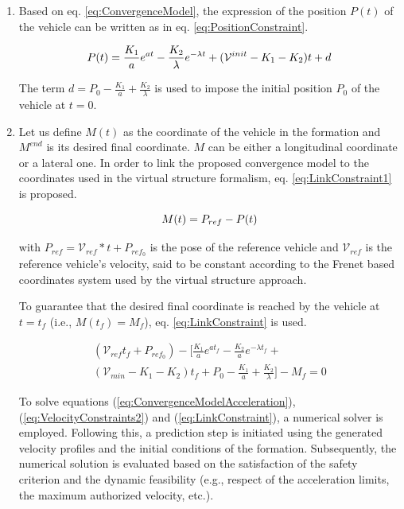 \begin{enumerate}
\item Based on eq. \ref{eq:ConvergenceModel}, the expression of the position $P(t)$ of the vehicle can be written as in eq. \ref{eq:PositionConstraint}. 

\begin{equation} \label{eq:PositionConstraint}
    P(t)= \frac{K_1}{a} e^{a t } - \frac{K_2}{\lambda} e^{-\lambda t }   + (\mathcal{V}^{init}- K_1 -K_2 )t +d \\
\end{equation}

The term $d=P_0 - \frac{K_1}{a} + \frac{K_2}{\lambda}$ is used to impose the initial position $P_0$ of the vehicle at $t=0$. 

\item Let us define $M(t)$ as the coordinate of the vehicle in the formation and $M^{end}$ is its desired final coordinate. $M$ can be either a longitudinal coordinate or a lateral one. In order to link the proposed convergence model to the coordinates used in the virtual structure formalism, eq. \ref{eq:LinkConstraint1} is proposed. 


\begin{equation} \label{eq:LinkConstraint1}
    M(t)= P_{ref} - P(t) \\
\end{equation}

\noindent with $P_{ref}=\mathcal{V}_{ref}*t + P_{ref_0}$ is the pose of the reference vehicle and $\mathcal{V}_{ref}$ is the reference vehicle's velocity, said to be constant according to the Frenet based coordinates system used by the virtual structure approach. 

To guarantee that the desired final coordinate is reached by the vehicle at $t=t_f$ (i.e., $M(t_f)=M_f$), eq. \ref{eq:LinkConstraint} is used. 

  
 \begin{align}\label{eq:LinkConstraint}
        ( \mathcal{V}_{ref} t_f + P_{ref_0})  - \big[\frac{K_1}{a}e^{at_f} - \frac{K_2}{a}e^{-\lambda t_f} + \\ (\mathcal{V}_{min} - K_1 - K_2)t_f  + P_0  - \frac{K_1}{a} + \frac{K_2}{\lambda} \big] -M_f =0
 \end{align}


To solve equations (\ref{eq:ConvergenceModelAcceleration}), (\ref{eq:VelocityConstraints2}) and (\ref{eq:LinkConstraint}), a numerical solver is employed. Following this, a prediction step is initiated using the generated velocity profiles and the initial conditions of the formation. Subsequently, the numerical solution is evaluated based on the satisfaction of the safety criterion and the dynamic feasibility (e.g., respect of the acceleration limits, the maximum authorized velocity, etc.).




\end{enumerate}
